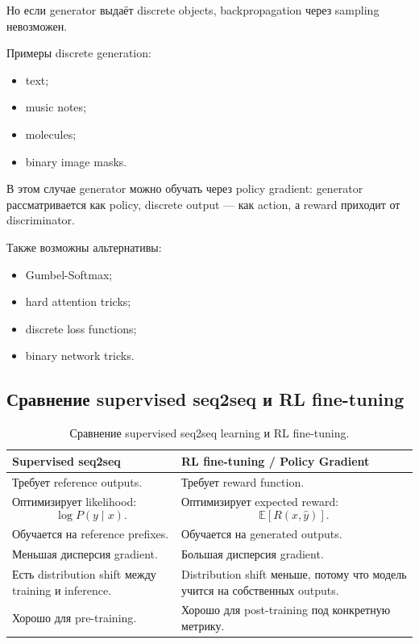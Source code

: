 \documentclass[a4paper,12pt]{article}
\begin{document}
Но если generator выдаёт discrete objects, backpropagation через sampling невозможен.

Примеры discrete generation:

\begin{itemize}
    \item text;
    \item music notes;
    \item molecules;
    \item binary image masks.
\end{itemize}

В этом случае generator можно обучать через policy gradient: generator рассматривается как policy, discrete output --- как action, а reward приходит от discriminator.

Также возможны альтернативы:

\begin{itemize}
    \item Gumbel-Softmax;
    \item hard attention tricks;
    \item discrete loss functions;
    \item binary network tricks.
\end{itemize}

\subsection{Сравнение supervised seq2seq и RL fine-tuning}

\begin{table}[H]
\centering
\begin{tabular}{p{} p{}}
\toprule
\textbf{Supervised seq2seq} & \textbf{RL fine-tuning / Policy Gradient} \\
\midrule

Требует reference outputs. &
Требует reward function. \\

Оптимизирует likelihood:
\[
\log P(y\mid x).
\]
&
Оптимизирует expected reward:
\[
\mathbb{E}[R(x,\hat{y})].
\]
\\

Обучается на reference prefixes. &
Обучается на generated outputs. \\

Меньшая дисперсия gradient. &
Большая дисперсия gradient. \\

Есть distribution shift между training и inference. &
Distribution shift меньше, потому что модель учится на собственных outputs. \\

Хорошо для pre-training. &
Хорошо для post-training под конкретную метрику. \\

\bottomrule
\end{tabular}
\caption{Сравнение supervised seq2seq learning и RL fine-tuning.}
\end{table}
\end{document}
